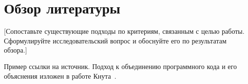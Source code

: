 \section{Обзор литературы}

[Сопоставьте существующие подходы по критериям, связанным с целью работы.
Сформулируйте исследовательский вопрос и обоснуйте его по результатам обзора.]

Пример ссылки на источник. Подход к объединению программного кода и его
объяснения изложен в работе Кнута~\cite{knuth1984}.
